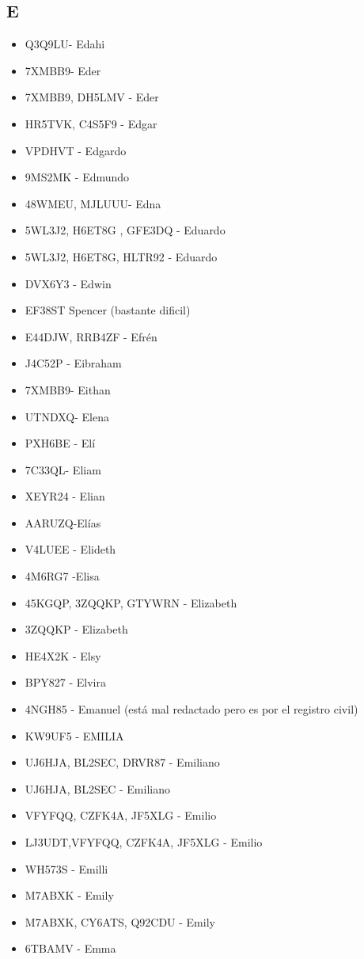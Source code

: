 \subsection*{E}
\begin{itemize}[leftmargin=*,nosep]
\item Q3Q9LU- Edahi
\item 7XMBB9- Eder
\item 7XMBB9, DH5LMV - Eder
\item HR5TVK, C4S5F9 - Edgar
\item VPDHVT - Edgardo
\item 9MS2MK - Edmundo
\item 48WMEU, MJLUUU- Edna
\item 5WL3J2, H6ET8G , GFE3DQ - Eduardo
\item 5WL3J2, H6ET8G, HLTR92 - Eduardo
\item DVX6Y3 - Edwin
\item EF38ST  Spencer (bastante dificil)
\item E44DJW, RRB4ZF  - Efrén
\item J4C52P - Eibraham
\item 7XMBB9- Eithan
\item UTNDXQ- Elena
\item PXH6BE - Elí
\item 7C33QL- Eliam
\item XEYR24 - Elian
\item AARUZQ-Elías
\item V4LUEE - Elideth
\item 4M6RG7 -Elisa
\item 45KGQP, 3ZQQKP, GTYWRN - Elizabeth
\item 3ZQQKP - Elizabeth
\item HE4X2K - Elsy
\item BPY827 - Elvira
\item 4NGH85 - Emanuel (está mal redactado pero es por el registro civil)
\item KW9UF5 - EMILIA
\item UJ6HJA, BL2SEC, DRVR87 - Emiliano
\item UJ6HJA, BL2SEC - Emiliano
\item VFYFQQ, CZFK4A, JF5XLG - Emilio
\item LJ3UDT,VFYFQQ, CZFK4A, JF5XLG - Emilio
\item WH573S - Emilli
\item M7ABXK - Emily
\item M7ABXK, CY6ATS, Q92CDU - Emily
\item 6TBAMV - Emma

\end{itemize}
